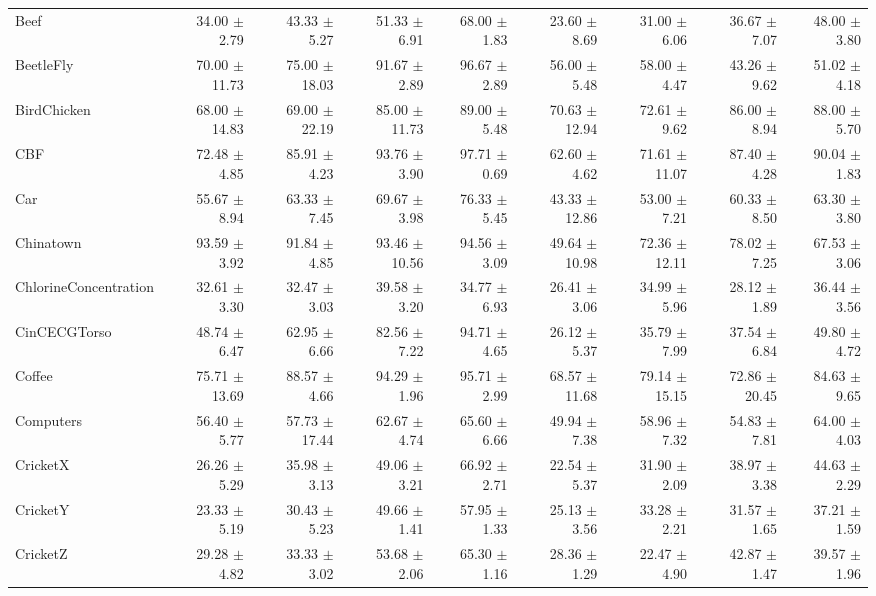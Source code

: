 \begin{landscape}
\begin{longtable}{lrrrrrrrr}
Beef & 34.00 $\pm$ 2.79 & 43.33 $\pm$ 5.27 & 51.33 $\pm$ 6.91 & 68.00 $\pm$ 1.83 & 23.60 $\pm$ 8.69 & 31.00 $\pm$ 6.06 & 36.67 $\pm$ 7.07 & 48.00 $\pm$ 3.80 \\
BeetleFly & 70.00 $\pm$ 11.73 & 75.00 $\pm$ 18.03 & 91.67 $\pm$ 2.89 & 96.67 $\pm$ 2.89 & 56.00 $\pm$ 5.48 & 58.00 $\pm$ 4.47 & 43.26 $\pm$ 9.62 & 51.02 $\pm$ 4.18 \\
BirdChicken & 68.00 $\pm$ 14.83 & 69.00 $\pm$ 22.19 & 85.00 $\pm$ 11.73 & 89.00 $\pm$ 5.48 & 70.63 $\pm$ 12.94 & 72.61 $\pm$ 9.62 & 86.00 $\pm$ 8.94 & 88.00 $\pm$ 5.70 \\
CBF & 72.48 $\pm$ 4.85 & 85.91 $\pm$ 4.23 & 93.76 $\pm$ 3.90 & 97.71 $\pm$ 0.69 & 62.60 $\pm$ 4.62 & 71.61 $\pm$ 11.07 & 87.40 $\pm$ 4.28 & 90.04 $\pm$ 1.83 \\
Car & 55.67 $\pm$ 8.94 & 63.33 $\pm$ 7.45 & 69.67 $\pm$ 3.98 & 76.33 $\pm$ 5.45 & 43.33 $\pm$ 12.86 & 53.00 $\pm$ 7.21 & 60.33 $\pm$ 8.50 & 63.30 $\pm$ 3.80 \\
Chinatown & 93.59 $\pm$ 3.92 & 91.84 $\pm$ 4.85 & 93.46 $\pm$ 10.56 & 94.56 $\pm$ 3.09 & 49.64 $\pm$ 10.98 & 72.36 $\pm$ 12.11 & 78.02 $\pm$ 7.25 & 67.53 $\pm$ 3.06 \\
ChlorineConcentration & 32.61 $\pm$ 3.30 & 32.47 $\pm$ 3.03 & 39.58 $\pm$ 3.20 & 34.77 $\pm$ 6.93 & 26.41 $\pm$ 3.06 & 34.99 $\pm$ 5.96 & 28.12 $\pm$ 1.89 & 36.44 $\pm$ 3.56 \\
CinCECGTorso & 48.74 $\pm$ 6.47 & 62.95 $\pm$ 6.66 & 82.56 $\pm$ 7.22 & 94.71 $\pm$ 4.65 & 26.12 $\pm$ 5.37 & 35.79 $\pm$ 7.99 & 37.54 $\pm$ 6.84 & 49.80 $\pm$ 4.72 \\
Coffee & 75.71 $\pm$ 13.69 & 88.57 $\pm$ 4.66 & 94.29 $\pm$ 1.96 & 95.71 $\pm$ 2.99 & 68.57 $\pm$ 11.68 & 79.14 $\pm$ 15.15 & 72.86 $\pm$ 20.45 & 84.63 $\pm$ 9.65 \\
Computers & 56.40 $\pm$ 5.77 & 57.73 $\pm$ 17.44 & 62.67 $\pm$ 4.74 & 65.60 $\pm$ 6.66 & 49.94 $\pm$ 7.38 & 58.96 $\pm$ 7.32 & 54.83 $\pm$ 7.81 & 64.00 $\pm$ 4.03 \\
CricketX & 26.26 $\pm$ 5.29 & 35.98 $\pm$ 3.13 & 49.06 $\pm$ 3.21 & 66.92 $\pm$ 2.71 & 22.54 $\pm$ 5.37 & 31.90 $\pm$ 2.09 & 38.97 $\pm$ 3.38 & 44.63 $\pm$ 2.29 \\
CricketY & 23.33 $\pm$ 5.19 & 30.43 $\pm$ 5.23 & 49.66 $\pm$ 1.41 & 57.95 $\pm$ 1.33 & 25.13 $\pm$ 3.56 & 33.28 $\pm$ 2.21 & 31.57 $\pm$ 1.65 & 37.21 $\pm$ 1.59 \\
CricketZ & 29.28 $\pm$ 4.82 & 33.33 $\pm$ 3.02 & 53.68 $\pm$ 2.06 & 65.30 $\pm$ 1.16 & 28.36 $\pm$ 1.29 & 22.47 $\pm$ 4.90 & 42.87 $\pm$ 1.47 & 39.57 $\pm$ 1.96 \\

\end{longtable}
\end{landscape}
